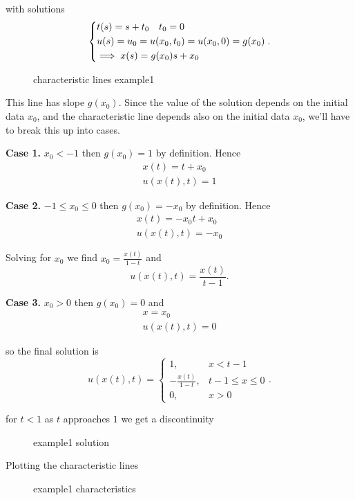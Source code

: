 with solutions
\[
\begin{dcases}
  t(s) = s + t_0 \quad t_0 = 0 \\
  u(s) = u_0 = u(x_0,t_0) = u(x_0,0) = g(x_0) \\
  \implies x(s) = g(x_0)s + x_0 \\
\end{dcases}
.\] 

\begin{figure}[ht]
    \centering
    \caption{characteristic lines example1}
    \label{fig:characteristic-lines-example1}
\end{figure}

This line has slope $g(x_0)$. Since the value of the solution depends on the initial data $x_0$, and the characteristic line depends also on the initial data $x_0$, we'll have to break this up into cases.

\textbf{Case 1.} $x_0<-1$ then $g(x_0)=1$ by definition. Hence
\begin{gather*}
  x(t) = t+x_0 \\
  \boxed{u(x(t),t) = 1}
\end{gather*}

\textbf{Case 2.} $-1\leq x_0\leq 0$ then $g(x_0)=-x_0$ by definition. Hence
\begin{gather*}
  x(t) = -x_0t+x_0\\
  u(x(t),t) = -x_0
\end{gather*}

Solving for $x_0$ we find $x_0= \frac{x(t)}{1-t}$ and
\[
  \boxed{u(x(t),t) = \frac{x(t)}{t-1}}
.\] 

\textbf{Case 3.} $x_0>0$ then $g(x_0)= 0$ and
\begin{gather*}
  x = x_0 \\
  \boxed{u(x(t),t) = 0}
\end{gather*}

so the final solution is
\[
  \boxed{u(x(t),t) = 
        \begin{cases}
            1, & x < t-1 \\
            - \frac{x(t)}{1-t}, & t-1\leq x\leq 0\\
            0, & x>0
        \end{cases}}
.\] 

for $t<1$ as $t$ approaches $1$ we get a discontinuity

\begin{figure}[ht]
    \centering
    \caption{example1 solution}
    \label{fig:example1-solution}
\end{figure}

Plotting the characteristic lines

\begin{figure}[ht]
    \centering
    \caption{example1 characteristics}
    \label{fig:example1-characteristics}
\end{figure}
